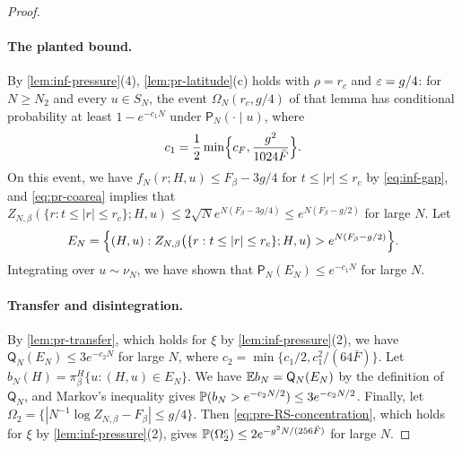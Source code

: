 \begin{proof}
\paragraph{The planted bound.} By \cref{lem:inf-pressure}(4), \cref{lem:pr-latitude}(c) holds with $\rho=r_c$ and $\varepsilon=g/4$: for $N\ge N_2$ and every $u\in S_N$, the event $\Omega_N(r_c,g/4)$ of that lemma has conditional probability at least $1-e^{-c_1N}$ under $\mathsf P_N(\cdot\mid u)$, where
\begin{equation*}
c_1=\frac12\min\Bigl\{c_F,\frac{g^2}{1024\bar F}\Bigr\}.
\end{equation*}
On this event, we have $f_N(r;H,u)\le F_\beta-3g/4$ for $t\le|r|\le r_c$ by \eqref{eq:inf-gap}, and \eqref{eq:pr-coarea} implies that $Z_{N,\beta}(\{r:t\le|r|\le r_c\};H,u)\le2\sqrt Ne^{N(F_\beta-3g/4)}\le e^{N(F_\beta-g/2)}$ for large $N$. Let
\begin{equation*}
E_N=\Bigl\{(H,u):Z_{N,\beta}\bigl(\{r:t\le|r|\le r_c\};H,u\bigr)>e^{N(F_\beta-g/2)}\Bigr\}.
\end{equation*}
Integrating over $u\sim\nu_N$, we have shown that $\mathsf P_N(E_N)\le e^{-c_1N}$ for large $N$.

\paragraph{Transfer and disintegration.} By \cref{lem:pr-transfer}, which holds for $\xi$ by \cref{lem:inf-pressure}(2), we have $\mathsf Q_N(E_N)\le3e^{-c_2N}$ for large $N$, where $c_2=\min\{c_1/2,c_1^2/(64\bar F)\}$. Let $b_N(H)=\pi_\beta^H\{u:(H,u)\in E_N\}$. We have $\mathbb E b_N=\mathsf Q_N(E_N)$ by the definition of $\mathsf Q_N$, and Markov's inequality gives $\mathbb P(b_N>e^{-c_2N/2})\le3e^{-c_2N/2}$. Finally, let $\Omega_2=\{|N^{-1}\log Z_{N,\beta}-F_\beta|\le g/4\}$. Then \eqref{eq:pre-RS-concentration}, which holds for $\xi$ by \cref{lem:inf-pressure}(2), gives $\mathbb P(\Omega_2^c)\le2e^{-g^2N/(256\bar F)}$ for large $N$.


\end{proof}
